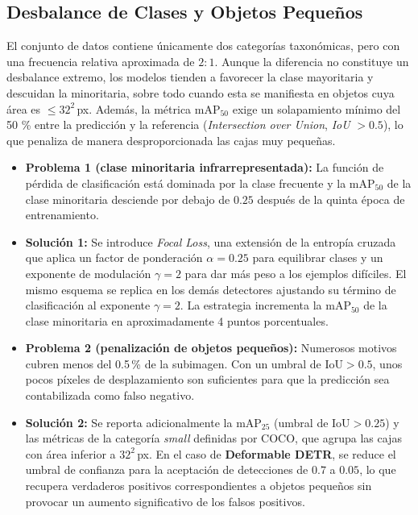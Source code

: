 \subsection{Desbalance de Clases y Objetos Pequeños}\label{ssec:small_obj}

El conjunto de datos contiene únicamente dos categorías taxonómicas, pero con una frecuencia relativa aproximada de \(2{:}1\).
Aunque la diferencia no constituye un desbalance extremo, los modelos tienden a favorecer la clase mayoritaria y descuidan la minoritaria, sobre todo cuando esta se manifiesta en objetos cuya área es \(\le 32^{2}\)\,px.
Además, la métrica \(\text{mAP}_{50}\) exige un solapamiento mínimo del 50 \% entre la predicción y la referencia (\textit{Intersection over Union}, \textit{IoU} \(>0.5\)), lo que penaliza de manera desproporcionada las cajas muy pequeñas.

\begin{itemize}
  \item \textbf{Problema 1 (clase minoritaria infrarrepresentada):}
        La función de pérdida de clasificación está dominada por la clase frecuente y la \(\text{mAP}_{50}\) de la clase minoritaria desciende por debajo de \(0.25\) después de la quinta época de entrenamiento.

  \item \textbf{Solución 1:}
        Se introduce \emph{Focal Loss}, una extensión de la entropía cruzada que aplica un factor de ponderación \(\alpha = 0.25\) para equilibrar clases y un exponente de modulación \(\gamma = 2\) para dar más peso a los ejemplos difíciles.
        El mismo esquema se replica en los demás detectores ajustando su término de clasificación al exponente \(\gamma = 2\).
        La estrategia incrementa la \(\text{mAP}_{50}\) de la clase minoritaria en aproximadamente 4 puntos porcentuales.

  \item \textbf{Problema 2 (penalización de objetos pequeños):}
        Numerosos motivos cubren menos del 0.5\,\% de la subimagen.
        Con un umbral de \(\text{IoU}>0.5\), unos pocos píxeles de desplazamiento son suficientes para que la predicción sea contabilizada como falso negativo.

  \item \textbf{Solución 2:}
        Se reporta adicionalmente la \(\text{mAP}_{25}\) (umbral de \(\text{IoU}>0.25\)) y las métricas de la categoría \emph{small} definidas por COCO, que agrupa las cajas con área inferior a \(32^{2}\)\,px.
        En el caso de \textbf{Deformable DETR}, se reduce el umbral de confianza para la aceptación de detecciones de \(0.7\) a \(0.05\), lo que recupera verdaderos positivos correspondientes a objetos pequeños sin provocar un aumento significativo de los falsos positivos.
\end{itemize}

